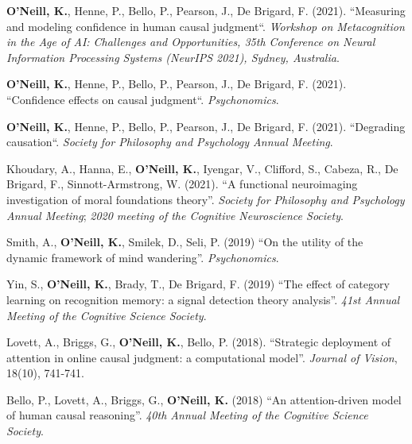 \textbf{O'Neill, K.}, Henne, P., Bello, P., Pearson, J., De Brigard,
F. (2021). ``Measuring and modeling confidence in human causal
judgment``. \emph{Workshop on Metacognition in the Age of AI:
Challenges and Opportunities, 35th Conference on Neural Information
Processing Systems (NeurIPS 2021), Sydney, Australia}.

\textbf{O'Neill, K.}, Henne, P., Bello, P., Pearson, J., De Brigard,
F. (2021). ``Confidence effects on causal
judgment``. \emph{Psychonomics}.

\textbf{O'Neill, K.}, Henne, P., Bello, P., Pearson, J., De Brigard,
F. (2021). ``Degrading causation``. \emph{Society for Philosophy and
Psychology Annual Meeting}.

Khoudary, A., Hanna, E., \textbf{O’Neill, K.}, Iyengar, V., Clifford,
S., Cabeza, R., De Brigard, F., Sinnott-Armstrong, W. (2021). ``A
functional neuroimaging investigation of moral foundations
theory''. \emph{Society for Philosophy and Psychology Annual Meeting};
\emph{2020 meeting of the Cognitive Neuroscience Society}.

Smith, A., \textbf{O'Neill, K.}, Smilek, D., Seli, P. (2019) ``On the
utility of the dynamic framework of mind
wandering''. \emph{Psychonomics}.

Yin, S., \textbf{O'Neill, K.}, Brady, T., De Brigard, F. (2019) ``The
effect of category learning on recognition memory: a signal detection
theory analysis''. \emph{41st Annual Meeting of the Cognitive Science
Society}.

Lovett, A., Briggs, G., \textbf{O'Neill, K.}, Bello,
P. (2018). ``Strategic deployment of attention in online causal
judgment: a computational model''. \emph{Journal of Vision}, 18(10),
741-741.

Bello, P., Lovett, A., Briggs, G., \textbf{O'Neill, K.} (2018) ``An
attention-driven model of human causal reasoning''. \emph{40th Annual
Meeting of the Cognitive Science Society}.

